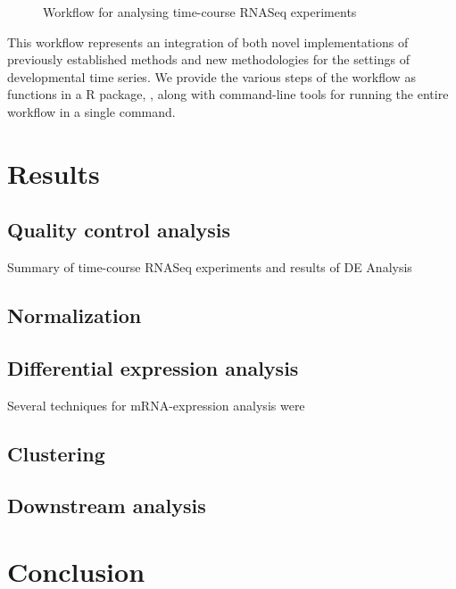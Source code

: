 \documentclass[11 pts]{article}
\newcommand{\xxx}[1]{\textcolor{red}{XXX}}
\begin{document}
\begin{figure}
\caption{Workflow for analysing time-course RNASeq experiments}
\label{fig:workflow}
\end{figure}

This workflow represents an integration of both novel implementations of previously established methods and new methodologies for the settings of developmental time series. We provide the various steps of the workflow as functions in a R package, \citettt{\xxx}, along with command-line tools for running the entire workflow in a single command. 

\section{Results}
\subsection{Quality control analysis}

\begin{table}
\caption{Summary of time-course RNASeq experiments and results of DE Analysis}
\end{table}


\subsection{Normalization}

\subsection{Differential expression analysis}

Several techniques for mRNA-expression analysis were

\subsection{Clustering}

\subsection{Downstream analysis}


\section{Conclusion}
\end{document}
